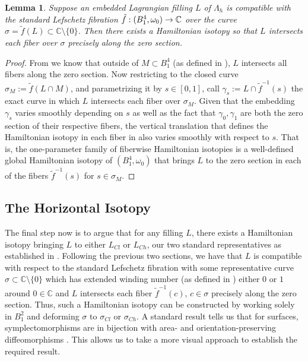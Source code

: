 \documentclass[10pt]{amsart}
\theoremstyle{plain}
\newtheorem{lemma}[thm]{Lemma}
\theoremstyle{definition}
\numberwithin{equation}{section}
\newcommand{\C}{\mathbb{C}}
\newcommand{\sse}{\subset}
\newcommand{\sm}{\setminus}
\begin{document}
\begin{lemma}\label{lem:hamisotozerosection} Suppose an embedded Lagrangian filling $L$ of $\Lambda_h$ is compatible with the standard Lefschetz fibration $\Tilde{f}:(B_1^4,\omega_0)\to \C$ over the curve $\sigma=\tilde{f}(L)\sse \C\sm \{0\}$. Then there exists a Hamiltonian isotopy so that $L$ intersects each fiber over $\sigma$ precisely along the zero section.
\end{lemma}
\begin{proof}
From  we know that outside of $M\sse B^4_1$ (as defined in ), $L$ intersects all fibers along the zero section. Now restricting to the closed curve $\sigma_M:=\tilde{f}(L\cap M)$, and parametrizing it by $s\in[0,1]$, call $\gamma_s := L\cap \tilde{f}^{-1}(s)$ the exact curve in which $L$ intersects each fiber over $\sigma_M$. Given that the embedding $\gamma_s$ varies smoothly depending on $s$ as well as the fact that $\gamma_0,\gamma_1$ are both the zero section of their respective fibers, the vertical translation that defines the Hamiltonian isotopy in each fiber in  also varies smoothly with respect to $s$. That is, the one-parameter family of fiberwise Hamiltonian isotopies is a well-defined global Hamiltonian isotopy of $(B^4_1,\omega_0)$ that brings $L$ to the zero section in each of the fibers $\tilde{f}^{-1}(s)$ for $s\in \sigma_M$.
\end{proof}










\subsection{The Horizontal Isotopy}\label{sec:horiziso}
The final step now is to argue that for any filling $L$, there exists a Hamiltonian isotopy bringing $L$ to either $L_{Cl}$ or $L_{Ch}$, our two standard representatives as established in . Following the previous two sections, we have that $L$ is compatible with respect to the standard Lefschetz fibration with some representative curve $\sigma\sse \C\sm \{0\}$ which has extended winding number (as defined in ) either $0$ or $1$ around $0\in \C$ and $L$ intersects each fiber $\tilde{f}^{-1}(c)$, $c\in\sigma$ precisely along the zero section. Thus, such a Hamiltonian isotopy can be constructed by working solely in $B^2_1$ and deforming $\sigma$ to $\sigma_{Cl}$ or $\sigma_{Ch}$. A standard result tells us that for surfaces, symplectomorphisms are in bijection with area- and orientation-preserving diffeomorphisms \cite{McDuff17_IntroSympl}. This allows us to take a more visual approach to establish the required result.
\end{document}
